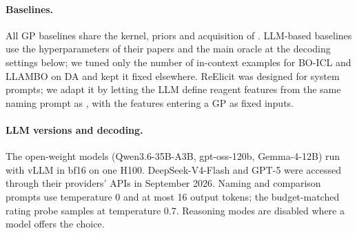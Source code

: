 \paragraph{Baselines.}
All GP baselines share the kernel, priors and acquisition of \ours{}. LLM-based baselines use the hyperparameters of their papers and the main oracle at the decoding settings below; we tuned only the number of in-context examples for BO-ICL and LLAMBO on DA and kept it fixed elsewhere. ReElicit was designed for system prompts; we adapt it by letting the LLM define reagent features from the same naming prompt as \ours{}, with the features entering a GP as fixed inputs.

\paragraph{LLM versions and decoding.}
The open-weight models (Qwen3.6-35B-A3B, gpt-oss-120b, Gemma-4-12B) run with vLLM in bf16 on one H100. DeepSeek-V4-Flash and GPT-5 were accessed through their providers' APIs in September 2026. Naming and comparison prompts use temperature 0 and at most 16 output tokens; the budget-matched rating probe samples at temperature 0.7. Reasoning modes are disabled where a model offers the choice.
